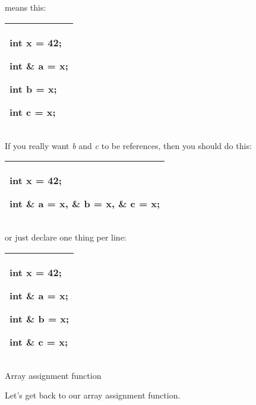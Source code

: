\documentclass[
]{article}
\begin{document}
means this:

\begin{longtable}[]{@{}l@{}}
\toprule
\endhead
\begin{minipage}[t]{0.97\columnwidth}\raggedright
int x = 42;

int \& a = x;

int b = x;

int c = x;\strut
\end{minipage}\tabularnewline
\bottomrule
\end{longtable}

If you really want \emph{b} and \emph{c} to be references, then you
should do this:

\begin{longtable}[]{@{}l@{}}
\toprule
\endhead
\begin{minipage}[t]{0.97\columnwidth}\raggedright
int x = 42;

int \& a = x, \textbf{\&} b = x, \textbf{\&} c = x;\strut
\end{minipage}\tabularnewline
\bottomrule
\end{longtable}

or just declare one thing per line:

\begin{longtable}[]{@{}l@{}}
\toprule
\endhead
\begin{minipage}[t]{0.97\columnwidth}\raggedright
int x = 42;

int \& a = x;

int \& b = x;

int \& c = x;\strut
\end{minipage}\tabularnewline
\bottomrule
\end{longtable}

Array assignment function

Let's get back to our array assignment function.
\end{document}
